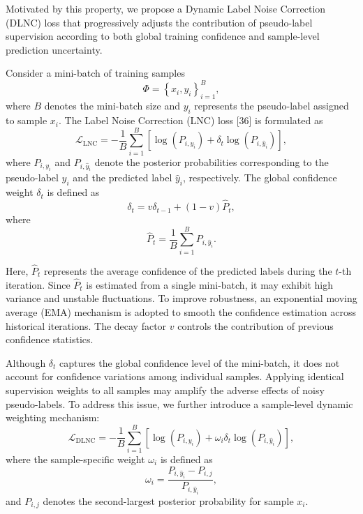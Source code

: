 \documentclass[lettersize,journal]{IEEEtran}
\begin{document}
Motivated by this property, we propose a Dynamic Label Noise Correction (DLNC) loss that progressively adjusts the contribution of pseudo-label supervision according to both global training confidence and sample-level prediction uncertainty.

Consider a mini-batch of training samples
\begin{equation}
\Phi = \left\{ x_i, y_i \right\}_{i=1}^{B},
\end{equation}
where $B$ denotes the mini-batch size and $y_i$ represents the pseudo-label assigned to sample $x_i$. The Label Noise Correction (LNC) loss [36] is formulated as
\begin{equation}
\mathcal{L}_{\mathrm{LNC}}
=
-\frac{1}{B}
\sum_{i=1}^{B}
\left[
\log(P_{i,y_i})
+
\delta_t
\log(P_{i,\hat{y}_i})
\right],
\end{equation}
where $P_{i,y_i}$ and $P_{i,\hat{y}_i}$ denote the posterior probabilities corresponding to the pseudo-label $y_i$ and the predicted label $\hat{y}_i$, respectively. The global confidence weight $\delta_t$ is defined as
\begin{equation}
\delta_t
=
v\delta_{t-1}
+
(1-v)\hat{P}_t,
\end{equation}
where
\begin{equation}
\hat{P}_t
=
\frac{1}{B}
\sum_{i=1}^{B}
P_{i,\hat{y}_i}.
\end{equation}

Here, $\hat{P}_t$ represents the average confidence of the predicted labels during the $t$-th iteration. Since $\hat{P}_t$ is estimated from a single mini-batch, it may exhibit high variance and unstable fluctuations. To improve robustness, an exponential moving average (EMA) mechanism is adopted to smooth the confidence estimation across historical iterations. The decay factor $v$ controls the contribution of previous confidence statistics.

Although $\delta_t$ captures the global confidence level of the mini-batch, it does not account for confidence variations among individual samples. Applying identical supervision weights to all samples may amplify the adverse effects of noisy pseudo-labels. To address this issue, we further introduce a sample-level dynamic weighting mechanism:
\begin{equation}
\mathcal{L}_{\mathrm{DLNC}}
=
-\frac{1}{B}
\sum_{i=1}^{B}
\left[
\log(P_{i,y_i})
+
\omega_i\delta_t
\log(P_{i,\hat{y}_i})
\right],
\end{equation}
where the sample-specific weight $\omega_i$ is defined as
\begin{equation}
\omega_i
=
\frac{
P_{i,\hat{y}_i}
-
P_{i,j}
}{
P_{i,\hat{y}_i}
},
\end{equation}
and $P_{i,j}$ denotes the second-largest posterior probability for sample $x_i$.
\end{document}
